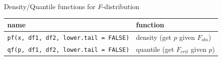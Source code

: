 \documentclass[presentation]{beamer}
\begin{document}
\begin{frame}[fragile,label={sec:org2c33abb}]{Density/Quantile functions for \emph{F}-distribution}
 \begin{small}

\begin{center}
\begin{tabular}{ll}
name & function\\
\hline
\texttt{pf(x, df1, df2, lower.tail = FALSE)} & density (get \(p\) given \(F_{obs}\))\\
\texttt{qf(p, df1, df2, lower.tail = FALSE)} & quantile (get \(F_{crit}\) given \(p\))\\
\hline
\end{tabular}
\end{center}

\end{small}
\end{frame}
\end{document}
